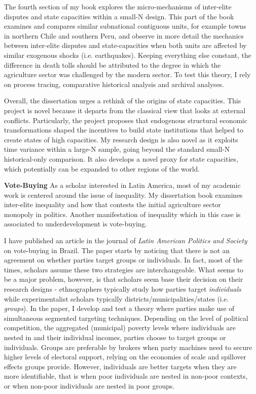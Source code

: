 \documentclass[11pt]{letter} %
\begin{document}
\begin{letter}{}
The fourth section of my book explores the micro-mechanisms of inter-elite disputes and state capacities within a small-N design. This part of the book examines and compares similar subnational contiguous units, for example towns in northern Chile and southern Peru, and observe in more detail the mechanics between inter-elite disputes and state-capacities when both units are affected by similar exogenous shocks (i.e. earthquakes). Keeping everything else constant, the difference in death tolls should be attributed to the degree in which the agriculture sector was challenged by the modern sector. To test this theory, I rely on process tracing, comparative historical analysis and archival analyses. 

Overall, the dissertation urges a rethink of the origins of state capacities. This project is novel because it departs from the classical view that looks at external conflicts. Particularly, the project proposes that endogenous structural economic transformations shaped the incentives to build state institutions that helped to create states of high capacities. My research design is also novel as it exploits time variance within a large-N sample, going beyond the standard small-N historical-only comparison. It also develops a novel proxy for state capacities, which potentially can be expanded to other regions of the world.


{\bf Vote-Buying} As a scholar interested in Latin America, most of my academic work is centered around the issue of inequality. My dissertation book examines inter-elite inequality and how that contests the initial agriculture sector monopoly in politics. Another manifestation of inequality which in this case is associated to underdevelopment is vote-buying. 

I have published an article in the journal of \emph{Latin American Politics and Society} on vote-buying in Brazil. The paper starts by noticing that there is not an agreement on whether parties target groups or individuals. In fact, most of the times, scholars assume these two strategies are interchangeable. What seems to be a major problem, however, is that scholars seem base their decision on their research designs - ethnographers typically study how parties target \emph{individuals} while experimentalist scholars typically districts/municipalities/states (i.e. \emph{groups}). In the paper, I develop and test a theory where parties make use of simultaneous segmented targeting techniques. Depending on the level of political competition, the aggregated (municipal) poverty levels where individuals are nested in and their individual incomes, parties choose to target groups or individuals. Groups are preferable by brokers when party machines need to secure higher levels of electoral support, relying on the economies of scale and spillover effects groups provide. However, individuals are better targets when they are more identifiable, that is when poor individuals are nested in non-poor contexts, or when non-poor individuals are nested in poor groups.


\end{letter}
\end{document}
